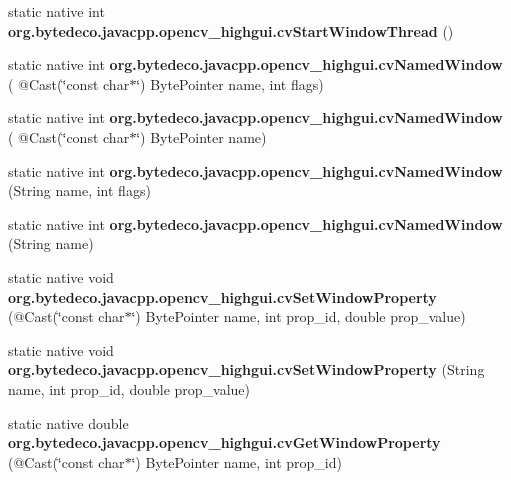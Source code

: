 \begin{DoxyCompactItemize}
\item 
\mbox{\label{group__highgui__c_gafd3a88e3bd303f7b2fe83aa0c191a346}} 
static native int {\bfseries org.\+bytedeco.\+javacpp.\+opencv\+\_\+highgui.\+cv\+Start\+Window\+Thread} ()
\item 
\mbox{\label{group__highgui__c_ga784cc390a3823cb7383408ca6a2c950f}} 
static native int {\bfseries org.\+bytedeco.\+javacpp.\+opencv\+\_\+highgui.\+cv\+Named\+Window} ( @Cast(\char`\"{}const char$\ast$\char`\"{}) Byte\+Pointer name, int flags)
\item 
\mbox{\label{group__highgui__c_gaf1afa8ccf3a613453903ab02fbe74ed8}} 
static native int {\bfseries org.\+bytedeco.\+javacpp.\+opencv\+\_\+highgui.\+cv\+Named\+Window} ( @Cast(\char`\"{}const char$\ast$\char`\"{}) Byte\+Pointer name)
\item 
\mbox{\label{group__highgui__c_ga42de644d72997d19b7a9e9c7e79e6d58}} 
static native int {\bfseries org.\+bytedeco.\+javacpp.\+opencv\+\_\+highgui.\+cv\+Named\+Window} (String name, int flags)
\item 
\mbox{\label{group__highgui__c_gac9186d5dfef4af9b40acc973fd65e1d2}} 
static native int {\bfseries org.\+bytedeco.\+javacpp.\+opencv\+\_\+highgui.\+cv\+Named\+Window} (String name)
\item 
\mbox{\label{group__highgui__c_ga353f516ee6b8c8204fa7a15a00a95836}} 
static native void {\bfseries org.\+bytedeco.\+javacpp.\+opencv\+\_\+highgui.\+cv\+Set\+Window\+Property} (@Cast(\char`\"{}const char$\ast$\char`\"{}) Byte\+Pointer name, int prop\+\_\+id, double prop\+\_\+value)
\item 
\mbox{\label{group__highgui__c_ga8e4ffc674acd2767fe6993b811831caf}} 
static native void {\bfseries org.\+bytedeco.\+javacpp.\+opencv\+\_\+highgui.\+cv\+Set\+Window\+Property} (String name, int prop\+\_\+id, double prop\+\_\+value)
\item 
\mbox{\label{group__highgui__c_gab83c544799342f18ac11240ab80d5d10}} 
static native double {\bfseries org.\+bytedeco.\+javacpp.\+opencv\+\_\+highgui.\+cv\+Get\+Window\+Property} (@Cast(\char`\"{}const char$\ast$\char`\"{}) Byte\+Pointer name, int prop\+\_\+id)

\end{DoxyCompactItemize}
